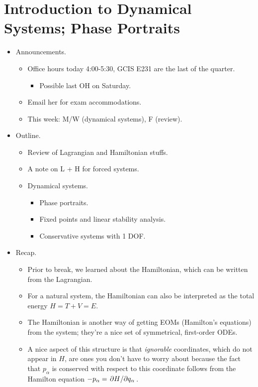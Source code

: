 \documentclass[../notes.tex]{subfiles}
\begin{document}
\section{Introduction to Dynamical Systems; Phase Portraits}
\begin{itemize}
    \item {}Announcements.
    \begin{itemize}
        \item Office hours today 4:00-5:30, GCIS E231 are the last of the quarter.
        \begin{itemize}
            \item Possible last OH on Saturday.
        \end{itemize}
        \item Email her for exam accommodations.
        \item This week: M/W (dynamical systems), F (review).
    \end{itemize}
    \item Outline.
    \begin{itemize}
        \item Review of Lagrangian and Hamiltonian stuffs.
        \item A note on L + H for forced systems.
        \item Dynamical systems.
        \begin{itemize}
            \item Phase portraits.
            \item Fixed points and linear stability analysis.
            \item Conservative systems with 1 DOF.
        \end{itemize}
    \end{itemize}
    \item Recap.
    \begin{itemize}
        \item Prior to break, we learned about the Hamiltonian, which can be written from the Lagrangian.
        \item For a natural system, the Hamiltonian can also be interpreted as the total energy $H=T+V=E$.
        \item The Hamiltonian is another way of getting EOMs (Hamilton's equations) from the system; they're a nice set of symmetrical, first-order ODEs.
        \item A nice aspect of this structure is that \emph{ignorable} coordinates, which do not appear in $H$, are ones you don't have to worry about because the fact that $p_\alpha$ is conserved with respect to this coordinate follows from the Hamilton equation $-p_\alpha=\pdv*{H}{q_\alpha}$.

\end{itemize}
\end{itemize}
\end{document}
